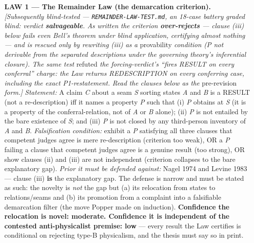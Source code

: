 \documentclass[11pt]{article}
\begin{document}
\textbf{LAW 1 — The Remainder Law (the demarcation criterion).} \emph{[Subsequently blind-tested — \texttt{REMAINDER-LAW-TEST.md}, an 18-case battery graded blind: verdict \textbf{salvageable}. As written the criterion \textbf{over-rejects} — clause (iii) below fails even Bell's theorem under blind application, certifying almost nothing — and is rescued only by rewriting (iii) as a} provability \emph{condition (P not derivable from the separated descriptions under the governing theory's inferential closure). The same test} refuted \emph{the forcing-verdict's ``fires RESULT on every conferral'' charge: the Law returns REDESCRIPTION on every conferring case, including the exact P1-restatement. Read the clauses below as the} pre-revision \emph{form.]} \emph{Statement:} A claim \emph{C} about a seam \emph{S} sorting states \emph{A} and \emph{B} is a RESULT (not a re-description) iff it names a property \emph{P} such that (i) \emph{P} obtains at \emph{S} (it is a property of the conferral-relation, not of \emph{A} or \emph{B} alone); (ii) \emph{P} is not entailed by the bare existence of \emph{S}; and (iii) \emph{P} is not closed by any third-person inventory of \emph{A} and \emph{B}. \emph{Falsification condition:} exhibit a \emph{P} satisfying all three clauses that competent judges agree is mere re-description (criterion too weak), OR a \emph{P} failing a clause that competent judges agree is a genuine result (too strong), OR show clauses (ii) and (iii) are not independent (criterion collapses to the bare explanatory gap). \emph{Prior it must be defended against:} Nagel 1974 and Levine 1983 — clause (iii) \textbf{is} the explanatory gap. The defense is narrow and must be stated as such: the novelty is \emph{not} the gap but (a) its relocation from states to relations/\allowbreak{}seams and (b) its promotion from a complaint into a falsifiable demarcation filter (the move Popper made on induction). \textbf{Confidence the relocation is novel: moderate. Confidence it is independent of the contested anti-physicalist premise: low} — every result the Law certifies is conditional on rejecting type-B physicalism, and the thesis must say so in print.
\end{document}
